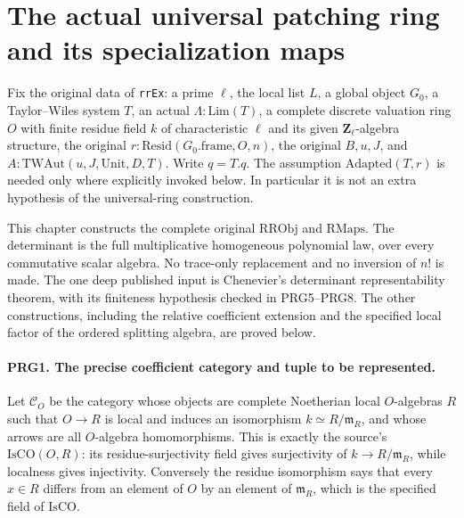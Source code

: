 \section{The actual universal patching ring and its specialization maps}
\label{sec:patched-ring-v040}

Fix the original data of \texttt{rrEx}: a prime \(\ell\), the local
list \(L\), a global object \(G_0\), a Taylor--Wiles system \(T\),
an actual \(\Lambda:\mathrm{Lim}(T)\), a complete discrete valuation
ring \(O\) with finite residue field \(k\) of characteristic \(\ell\)
and its given \(\mathbf Z_\ell\)-algebra structure, the original
\(r:\mathrm{Resid}(G_0.\mathrm{frame},O,n)\), the original
\(B,u,J\), and \(A:\mathrm{TWAut}(u,J,\mathrm{Unit},D,T)\).
Write \(q=T.q\). The assumption \(\mathrm{Adapted}(T,r)\) is needed
only where explicitly invoked below. In particular it is not an
extra hypothesis of the universal-ring construction.

This chapter constructs the complete original \(\mathrm{RRObj}\) and
\(\mathrm{RMaps}\). The determinant is the full multiplicative
homogeneous polynomial law, over every commutative scalar algebra.
No trace-only replacement and no inversion of \(n!\) is made.
The one deep published input is Chenevier's determinant
representability theorem, with its finiteness hypothesis checked in
PRG5--PRG8. The other constructions, including the relative
coefficient extension and the specified local factor of the ordered
splitting algebra, are proved below.

\paragraph{PRG1. The precise coefficient category and tuple to be represented.}
\label{claim:PRG1}
Let \(\mathcal C_O\) be the category whose objects are complete
Noetherian local \(O\)-algebras \(R\) such that \(O\to R\) is local
and induces an isomorphism \(k\simeq R/\mathfrak m_R\), and whose
arrows are all \(O\)-algebra homomorphisms. This is exactly the
source's \(\mathrm{IsCO}(O,R)\): its residue-surjectivity field gives
surjectivity of \(k\to R/\mathfrak m_R\), while localness gives
injectivity. Conversely the residue isomorphism says that every
\(x\in R\) differs from an element of \(O\) by an element of
\(\mathfrak m_R\), which is the specified field of \(\mathrm{IsCO}\).

